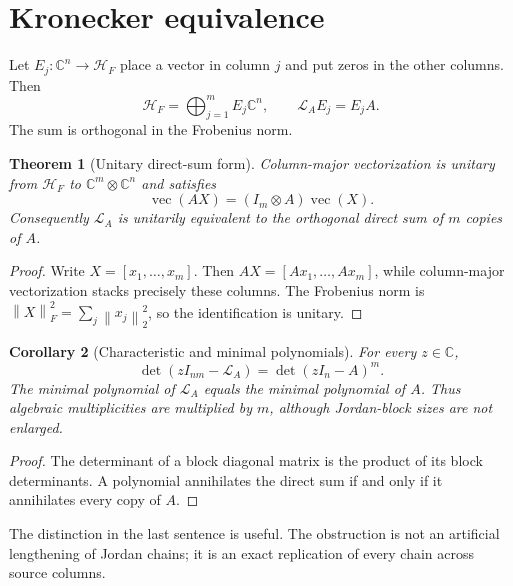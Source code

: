 \documentclass[12pt]{article}
\newtheorem{theorem}{Theorem}[section]
\newtheorem{corollary}[theorem]{Corollary}
\theoremstyle{remark}
\newcommand{\cH}{\mathcal H}
\newcommand{\cL}{\mathcal L}
\newcommand{\vecop}{\operatorname{vec}}
\newcommand{\norm}[1]{\left\lVert#1\right\rVert}
\begin{document}
\section{Kronecker equivalence}

Let $E_j:\mathbb C^n\to\cH_F$ place a vector in column $j$ and put zeros in
the other columns.  Then
\begin{equation}\label{eq:reducing-columns}
 \cH_F=\bigoplus_{j=1}^m E_j\mathbb C^n,
 \qquad
 \cL_A E_j=E_j A.
\end{equation}
The sum is orthogonal in the Frobenius norm.

\begin{theorem}[Unitary direct-sum form]\label{thm:direct-sum}
Column-major vectorization is unitary from $\cH_F$ to
$\mathbb C^m\otimes\mathbb C^n$ and satisfies
\begin{equation}\label{eq:kron}
 \vecop(AX)=(I_m\otimes A)\vecop(X).
\end{equation}
Consequently $\cL_A$ is unitarily equivalent to the orthogonal direct sum of
$m$ copies of $A$.
\end{theorem}

\begin{proof}
Write $X=[x_1,\ldots,x_m]$.  Then
$AX=[Ax_1,\ldots,Ax_m]$, while column-major vectorization stacks precisely
these columns.  The Frobenius norm is
$\norm X_F^2=\sum_j\norm{x_j}_2^2$, so the identification is unitary.
\end{proof}

\begin{corollary}[Characteristic and minimal polynomials]\label{cor:polynomials}
For every $z\in\mathbb C$,
\begin{equation}\label{eq:char-power}
 \det(zI_{nm}-\cL_A)=\det(zI_n-A)^m.
\end{equation}
The minimal polynomial of $\cL_A$ equals the minimal polynomial of $A$.
Thus algebraic multiplicities are multiplied by $m$, although Jordan-block
sizes are not enlarged.
\end{corollary}

\begin{proof}
The determinant of a block diagonal matrix is the product of its block
determinants.  A polynomial annihilates the direct sum if and only if it
annihilates every copy of $A$.
\end{proof}

The distinction in the last sentence is useful.  The obstruction is not an
artificial lengthening of Jordan chains; it is an exact replication of every
chain across source columns.
\end{document}
